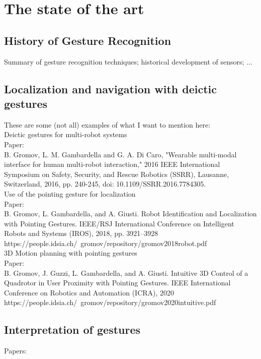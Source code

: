 \chapter{The state of the art}

\section{History of Gesture Recognition}
Summary of gesture recognition techniques;
historical development of sensors;
...

\section{Localization and navigation with deictic gestures}

These are some (not all) examples of what I want to mention here:\\
 
Deictic gestures for multi-robot systems \\

Paper: \\
B. Gromov, L. M. Gambardella and G. A. Di Caro, "Wearable multi-modal interface for human multi-robot interaction," 2016 IEEE International Symposium on Safety, Security, and Rescue Robotics (SSRR), Lausanne, Switzerland, 2016, pp. 240-245, doi: 10.1109/SSRR.2016.7784305.\\

Use of the pointing gesture for localization \\

Paper: \\
B. Gromov, L. Gambardella, and A. Giusti. Robot Identification and Localization with Pointing Gestures. IEEE/RSJ International Conference on Intelligent Robots and Systems (IROS), 2018, pp. 3921–3928 https://people.idsia.ch/~gromov/repository/gromov2018robot.pdf \\

3D Motion planning with pointing gestures \\

Paper: \\
B. Gromov, J. Guzzi, L. Gambardella, and A. Giusti. Intuitive 3D Control of a Quadrotor in User Proximity with Pointing Gestures. IEEE International Conference on Robotics and Automation (ICRA), 2020 https://people.idsia.ch/~gromov/repository/gromov2020intuitive.pdf

\section{Interpretation of gestures}
Papers:\\

